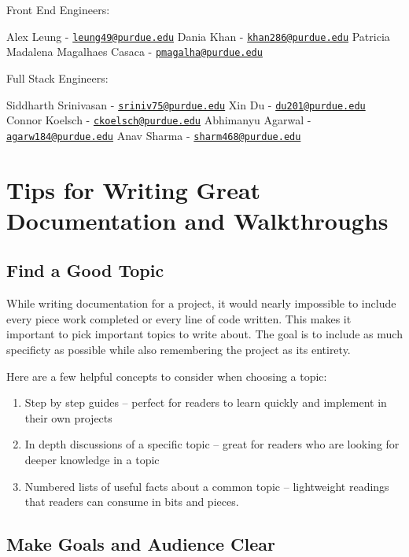 \documentclass[]{book}
\begin{document}
Front End Engineers:

Alex Leung -
\href{mailto:leung49@purdue.edu}{\nolinkurl{leung49@purdue.edu}} Dania
Khan - \href{mailto:khan286@purdue.edu}{\nolinkurl{khan286@purdue.edu}}
Patricia Madalena Magalhaes Casaca -
\href{mailto:pmagalha@purdue.edu}{\nolinkurl{pmagalha@purdue.edu}}

Full Stack Engineers:

Siddharth Srinivasan -
\href{mailto:sriniv75@purdue.edu}{\nolinkurl{sriniv75@purdue.edu}} Xin
Du - \href{mailto:du201@purdue.edu}{\nolinkurl{du201@purdue.edu}} Connor
Koelsch -
\href{mailto:ckoelsch@purdue.edu}{\nolinkurl{ckoelsch@purdue.edu}}
Abhimanyu Agarwal -
\href{mailto:agarw184@purdue.edu}{\nolinkurl{agarw184@purdue.edu}} Anav
Sharma -
\href{mailto:sharm468@purdue.edu}{\nolinkurl{sharm468@purdue.edu}}

\chapter{Tips for Writing Great Documentation and
Walkthroughs}\label{tips-for-writing-great-documentation-and-walkthroughs}

\section{Find a Good Topic}\label{find-a-good-topic}

While writing documentation for a project, it would nearly impossible to
include every piece work completed or every line of code written. This
makes it important to pick important topics to write about. The goal is
to include as much specificty as possible while also remembering the
project as its entirety.

Here are a few helpful concepts to consider when choosing a topic:

\begin{enumerate}
\def\labelenumi{\arabic{enumi}.}
\item
  Step by step guides -- perfect for readers to learn quickly and
  implement in their own projects
\item
  In depth discussions of a specific topic -- great for readers who are
  looking for deeper knowledge in a topic
\item
  Numbered lists of useful facts about a common topic -- lightweight
  readings that readers can consume in bits and pieces.
\end{enumerate}

\section{Make Goals and Audience
Clear}\label{make-goals-and-audience-clear}
\end{document}
